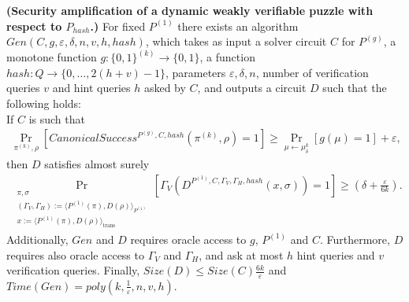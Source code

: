 \begin{lemma}\textbf{(Security amplification of a dynamic weakly verifiable puzzle with respect to $P_{hash}$.)}
  \label{lemma:sec_amp_for_p_hash}
  For fixed $P^{(1)}$ there exists an algorithm $Gen(C, g, \varepsilon, \delta, n, v, h, hash)$,
  which takes as input a solver circuit $C$ for $P^{(g)}$, a monotone function $g:\{0,1\}^{(k)} \rightarrow \{0,1\}$,
  a function $hash : Q \rightarrow \{0, \dots, 2(h+v)-1\}$, parameters $\varepsilon, \delta, n$,
  number of verification queries $v$ and hint queries $h$ asked by $C$, and outputs a circuit $D$
  such that the following holds: \\
  If $C$ is such that \\
  \begin{align*}
    \underset{\pi^{(k)}, \rho}{\Pr}\left[CanonicalSuccess^{P^{(g)}, C, hash}(\pi^{(k)}, \rho)=1\right] \geq \underset{\mu \leftarrow \mu_\delta^k}{\Pr}[g(\mu) = 1] + \varepsilon,
  \end{align*}
  then $D$ satisfies almost surely
  \begin{align*}
    \underset{\substack{\pi, \sigma \\ (\Gamma_V,\Gamma_H) := \langle P^{(1)}(\pi), D(\rho) \rangle_{P^{(1)}} \\ x := \langle P^{(1)}(\pi), D(\rho) \rangle_{\text{trans}}}}
    {\Pr}\left[\Gamma_V(D^{P^{(1)},C,\Gamma_V, \Gamma_H, hash}(x, \sigma)) = 1\right] \geq (\delta + \frac{\varepsilon}{6k}).
  \end{align*}
  Additionally, $Gen$ and $D$ requires oracle access to $g$, $P^{(1)}$ and $C$.
  Furthermore, $D$ requires also oracle access to $\Gamma_V$ and $\Gamma_H$,
  and ask at most $h$ hint queries and $v$ verification queries.
  Finally, $Size(D) \leq Size(C)\frac{6k}{\varepsilon}$ and $Time(Gen) = poly(k, \frac{1}{\varepsilon}, n, v, h)$.
\end{lemma}
%
